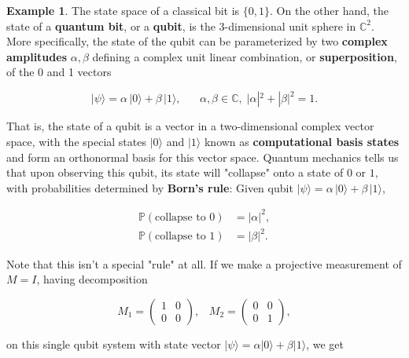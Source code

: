 \documentclass{article}
\theoremstyle{definition}
\newtheorem{example}{Example}[section]
\begin{document}
      \begin{example}
        The state space of a classical bit is $\{0, 1\}$. On the other hand, the state of a \textbf{quantum bit}, or a \textbf{qubit}, is the 3-dimensional unit sphere in $\mathbb{C}^2$. More specifically, the state of the qubit can be parameterized by two \textbf{complex amplitudes} $\alpha, \beta$ defining a complex unit linear combination, or \textbf{superposition}, of the 0 and 1 vectors

        \[|\psi \rangle = \alpha \,|0 \rangle + \beta \, | 1\rangle, \;\;\;\;\;\; \alpha, \beta \in \mathbb{C}, \; |\alpha|^2 + |\beta|^2 = 1.\]

        That is, the state of a qubit is a vector in a two-dimensional complex vector space, with the special states $|0\rangle$ and $|1\rangle$ known as \textbf{computational basis states} and form an orthonormal basis for this vector space. Quantum mechanics tells us that upon observing this qubit, its state will "collapse" onto a state of $0$ or $1$, with probabilities determined by \textbf{Born's rule}: Given qubit $|\psi \rangle = \alpha \,|0 \rangle + \beta \, | 1\rangle$,

        \begin{align*}
          \mathbb{P}(\text{collapse to } 0) & = |\alpha|^2, \\
          \mathbb{P}(\text{collapse to } 1) & = |\beta|^2.
        \end{align*}

        Note that this isn't a special "rule" at all. If we make a projective measurement of $M = I$, having decomposition

          \[M_1 = \begin{pmatrix} 1 & 0 \\ 0 & 0 \end{pmatrix}, \;\;\; M_2 = \begin{pmatrix} 0 & 0 \\ 0 & 1 \end{pmatrix},\]

        on this single qubit system with state vector $|\psi \rangle = \alpha |0\rangle + \beta |1 \rangle$, we get


\end{example}
\end{document}
